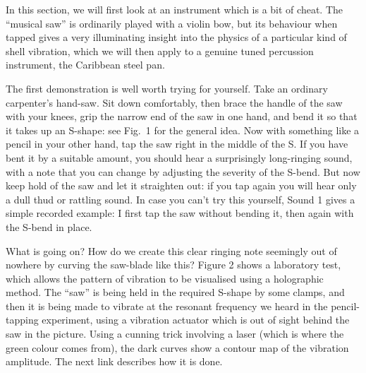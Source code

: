 

  In this section, we will first look at an instrument which is a bit of cheat. 
  The ``musical saw'' is ordinarily played with a violin bow, but its behaviour 
  when tapped gives a very illuminating insight into the physics of a 
  particular kind of shell vibration, which we will then apply to a genuine 
  tuned percussion instrument, the Caribbean steel pan. 

  The first demonstration is well worth trying for yourself. Take an ordinary 
  carpenter's hand-saw. Sit down comfortably, then brace the handle of the saw 
  with your knees, grip the narrow end of the saw in one hand, and bend it so 
  that it takes up an S-shape: see Fig.\ 1 for the general idea. Now with 
  something like a pencil in your other hand, tap the saw right in the middle 
  of the S. If you have bent it by a suitable amount, you should hear a 
  surprisingly long-ringing sound, with a note that you can change by adjusting 
  the severity of the S-bend. But now keep hold of the saw and let it 
  straighten out: if you tap again you will hear only a dull thud or rattling 
  sound. In case you can't try this yourself, Sound 1 gives a simple recorded 
  example: I first tap the saw without bending it, then again with the S-bend 
  in place. 



  What is going on? How do we create this clear ringing note seemingly out of 
  nowhere by curving the saw-blade like this? Figure 2 shows a laboratory test, 
  which allows the pattern of vibration to be visualised using a holographic 
  method. The ``saw'' is being held in the required S-shape by some clamps, and 
  then it is being made to vibrate at the resonant frequency we heard in the 
  pencil-tapping experiment, using a vibration actuator which is out of sight 
  behind the saw in the picture. Using a cunning trick involving a laser (which 
  is where the green colour comes from), the dark curves show a contour map of 
  the vibration amplitude. The next link describes how it is done. 


